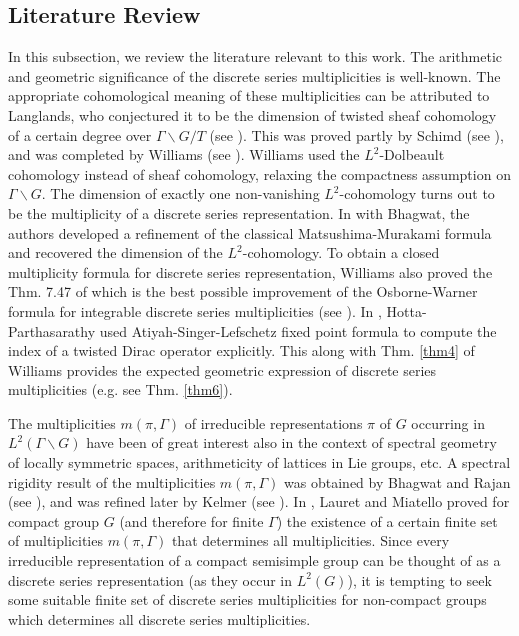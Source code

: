 \documentclass[11 pt]{amsart}
\theoremstyle{definition}
\numberwithin{equation}{section}
\begin{document}
\subsection{Literature Review}
In this subsection, we review the literature relevant to this work. The arithmetic and geometric significance of the discrete series multiplicities is well-known. The appropriate cohomological meaning of these multiplicities can be attributed to Langlands, who conjectured it to be the dimension of twisted sheaf cohomology of a certain degree over $\Gamma \backslash G / T$ (see \cite{RL}). This was proved partly by Schimd (see \cite{WS}), and was completed by Williams (see \cite{FW2}). Williams used the $L^2$-Dolbeault cohomology instead of sheaf cohomology, relaxing the compactness assumption on $\Gamma \backslash G$. The dimension of exactly one non-vanishing $L^2$-cohomology turns out to be the multiplicity of a discrete series representation. In \cite{BMS} with Bhagwat, the authors developed a refinement of the classical Matsushima-Murakami formula and recovered the dimension of the $L^2$-cohomology. To obtain a closed multiplicity formula for discrete series representation, Williams also proved the Thm. 7.47 of \cite{FW} which is the best possible improvement of the Osborne-Warner formula for integrable discrete series multiplicities (see \cite{OW}). In \cite{HP}, Hotta-Parthasarathy used Atiyah-Singer-Lefschetz fixed point formula to compute the index of a twisted Dirac operator explicitly. This along with Thm. \ref{thm4} of Williams provides the expected geometric expression of discrete series multiplicities (e.g. see Thm. \ref{thm6}).

\vspace{5pt}

The multiplicities $m(\pi, \Gamma)$ of irreducible representations $\pi$ of $G$ occurring in $L^2(\Gamma \backslash G)$ have been of great interest also in the context of spectral geometry of locally symmetric spaces, arithmeticity of lattices in Lie groups, etc. A spectral rigidity result of the multiplicities $m(\pi, \Gamma)$ was obtained by Bhagwat and Rajan (see \cite{BR}), and was refined later by Kelmer (see \cite{DK}). In \cite{LM}, Lauret and Miatello proved for compact group $G$ (and therefore for finite $\Gamma$) the existence of a certain finite set of multiplicities $m(\pi, \Gamma)$ that determines all multiplicities. Since every irreducible representation of a compact semisimple group can be thought of as a discrete series representation (as they occur in $L^2(G)$), it is tempting to seek some suitable finite set of discrete series multiplicities for non-compact groups which determines all discrete series multiplicities. 
\end{document}
